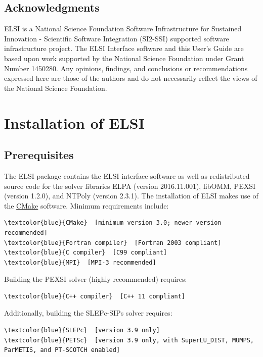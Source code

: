 \documentclass{report}
\begin{document}
\section{Acknowledgments}
\label{sec:thanks}
ELSI is a National Science Foundation Software Infrastructure for Sustained Innovation - Scientific Software Integration (SI2-SSI) supported software infrastructure project.  The ELSI Interface software and this User's Guide are based upon work supported by the National Science Foundation under Grant Number 1450280.  Any opinions, findings, and conclusions or recommendations expressed here are those of the authors and do not necessarily reflect the views of the National Science Foundation.

\chapter{Installation of ELSI}
\section{Prerequisites}
\label{sec:prereq}
The ELSI package contains the ELSI interface software as well as redistributed source code for the solver libraries ELPA (version 2016.11.001), libOMM, PEXSI (version 1.2.0), and NTPoly (version 2.3.1).  The installation of ELSI makes use of the \href{http://cmake.org}{CMake} software.  Minimum requirements include:
\begin{Verbatim}[commandchars=\\\{\}]
\textcolor{blue}{CMake}  [minimum version 3.0; newer version recommended]
\textcolor{blue}{Fortran compiler}  [Fortran 2003 compliant]
\textcolor{blue}{C compiler}  [C99 compliant]
\textcolor{blue}{MPI}  [MPI-3 recommended]
\end{Verbatim}

Building the PEXSI solver (highly recommended) requires:
\begin{Verbatim}[commandchars=\\\{\}]
\textcolor{blue}{C++ compiler}  [C++ 11 compliant]
\end{Verbatim}

Additionally, building the SLEPc-SIPs solver requires:
\begin{Verbatim}[commandchars=\\\{\}]
\textcolor{blue}{SLEPc}  [version 3.9 only]
\textcolor{blue}{PETSc}  [version 3.9 only, with SuperLU_DIST, MUMPS, ParMETIS, and PT-SCOTCH enabled]
\end{Verbatim}
\end{document}
